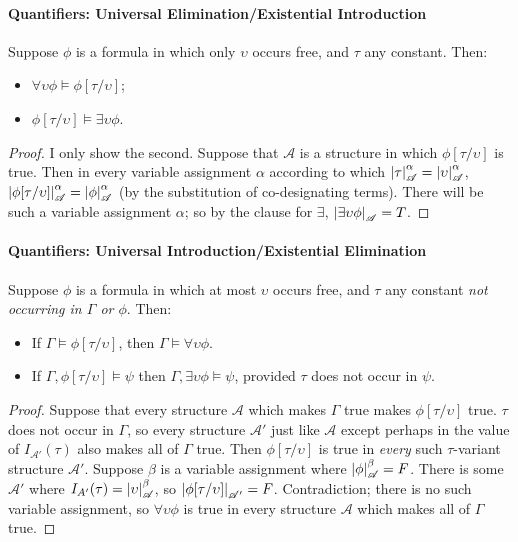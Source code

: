 \paragraph{Quantifiers: Universal Elimination/Existential Introduction}

\begin{theorem}\label{ueei}
Suppose $\phi$ is a formula in which only $\upsilon$ occurs free, and $\tau$ any constant. Then: \begin{itemize}
	\item $\forall\upsilon\phi \vDash \phi[\tau/\upsilon]$;
	\item $\phi[\tau/\upsilon]\vDash \exists\upsilon\phi$.
\end{itemize} \begin{proof}
	 I only show the second. Suppose that $\mathscr{A}$ is a structure in which $\phi[\tau/\upsilon]$ is true. Then in every variable assignment $\alpha$ according to which $\left|\tau\right|^{\alpha}_{\mathscr{A}}=\left|\upsilon\right|^{\alpha}_{\mathscr{A}}$, $\left|\phi[\tau/\upsilon]\right|^{\alpha}_{\mathscr{A}}=\left|\phi\right|^{\alpha}_{\mathscr{A}}$ (by the substitution of co-designating terms).  There will be such a variable assignment $\alpha$; so by the clause for $\exists$, $\left|\exists\upsilon\phi\right|_{\mathscr{A}}=T$.
	
\end{proof}
\end{theorem}

\paragraph{Quantifiers: Universal Introduction/Existential Elimination}

\begin{theorem}\label{uiee}
	Suppose $\phi$ is a formula in which at most $\upsilon$ occurs free, and $\tau$ any constant \emph{not occurring in $\Gamma$ or $\phi$}. Then: \begin{itemize}
		\item If $\Gamma \vDash \phi[\tau/\upsilon]$, then $\Gamma\vDash\forall\upsilon\phi$.
		\item If $\Gamma,\phi[\tau/\upsilon]\vDash \psi$ then
	 $\Gamma,\exists\upsilon\phi\vDash\psi$, provided $\tau$ does not occur in $\psi$.
	\end{itemize} \begin{proof}
	  Suppose that every structure $\mathscr{A}$ which makes $\Gamma$ true makes $\phi[\tau/\upsilon]$ true. $\tau$ does not occur in $\Gamma$, so every structure $\mathscr{A}'$ just like $\mathscr{A}$ except perhaps in the value of $I_{\mathscr{A}'}(\tau)$ also makes all of $\Gamma$ true. Then $\phi[\tau/\upsilon]$ is true in \emph{every} such $\tau$-variant structure $\mathscr{A}'$. 	
	Suppose $\beta$ is a variable assignment where $\left|\phi\right|^{\beta}_{\mathscr{A}}=F$. There is some $\mathscr{A}'$ where $I_{A'}(\tau)=\left|\upsilon\right|^{\beta}_{\mathscr{A}}$, so $\left|\phi[\tau/\upsilon]\right|_{\mathscr{A'}}=F$. Contradiction; there is no such variable assignment, so $\forall\upsilon\phi$ is true in every structure $\mathscr{A}$ which makes all of $\Gamma$ true.

\end{proof}
\end{theorem}

